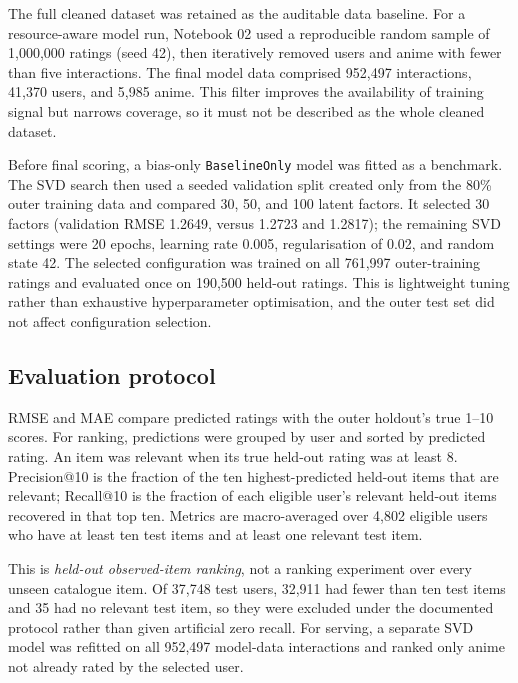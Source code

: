 \documentclass[12pt,a4paper]{article}
\begin{document}
The full cleaned dataset was retained as the auditable data baseline. For a resource-aware model run, Notebook 02 used a reproducible random sample of 1,000,000 ratings (seed 42), then iteratively removed users and anime with fewer than five interactions. The final model data comprised 952,497 interactions, 41,370 users, and 5,985 anime. This filter improves the availability of training signal but narrows coverage, so it must not be described as the whole cleaned dataset.

Before final scoring, a bias-only \texttt{BaselineOnly} model was fitted as a benchmark. The SVD search then used a seeded validation split created only from the 80\% outer training data and compared 30, 50, and 100 latent factors. It selected 30 factors (validation RMSE 1.2649, versus 1.2723 and 1.2817); the remaining SVD settings were 20 epochs, learning rate 0.005, regularisation of 0.02, and random state 42. The selected configuration was trained on all 761,997 outer-training ratings and evaluated once on 190,500 held-out ratings. This is lightweight tuning rather than exhaustive hyperparameter optimisation, and the outer test set did not affect configuration selection.

\subsection{Evaluation protocol}
RMSE and MAE compare predicted ratings with the outer holdout's true 1--10 scores. For ranking, predictions were grouped by user and sorted by predicted rating. An item was relevant when its true held-out rating was at least 8. Precision@10 is the fraction of the ten highest-predicted held-out items that are relevant; Recall@10 is the fraction of each eligible user's relevant held-out items recovered in that top ten. Metrics are macro-averaged over 4,802 eligible users who have at least ten test items and at least one relevant test item.

This is \emph{held-out observed-item ranking}, not a ranking experiment over every unseen catalogue item. Of 37,748 test users, 32,911 had fewer than ten test items and 35 had no relevant test item, so they were excluded under the documented protocol rather than given artificial zero recall. For serving, a separate SVD model was refitted on all 952,497 model-data interactions and ranked only anime not already rated by the selected user.
\end{document}
